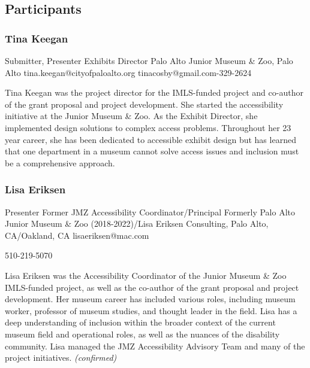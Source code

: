 \documentclass{report}
\begin{document}
            \subsection*{Participants}
              \subsubsection*{ Tina  Keegan }
              Submitter, Presenter\newline
              Exhibits Director\newline
              Palo Alto Junior Museum \& Zoo, Palo Alto
              \newline
              tina.keegan@cityofpaloalto.org\newline
              tinacosby@gmail.com-329-2624\newline

              Tina Keegan was the project director for the IMLS-funded project and co-author of the grant proposal and project development. She started the accessibility initiative at the Junior Museum \& Zoo. As the Exhibit Director, she implemented design solutions to complex access problems. Throughout her 23 year career, she has been dedicated to accessible exhibit design but has learned that one department in a museum cannot solve access issues and inclusion must be a comprehensive approach.\newline


              

              
                \subsubsection*{ Lisa Eriksen }
                Presenter\newline
                Former JMZ Accessibility Coordinator/Principal\newline
                Formerly Palo Alto Junior Museum \& Zoo (2018-2022)/Lisa Eriksen Consulting, Palo Alto, CA/Oakland, CA
                \newline
                lisaeriksen@mac.com\newline
                
                510-219-5070\newline

                Lisa Eriksen was the Accessibility Coordinator of the Junior Museum \& Zoo IMLS-funded project, as well as the co-author of the grant proposal and project development. Her museum career has included various roles, including museum worker, professor of museum studies, and thought leader in the field. Lisa has a deep understanding of inclusion within the broader context of the current museum field and operational roles, as well as the nuances of the disability community. Lisa managed the JMZ Accessibility Advisory Team and many of the project initiatives.
                \emph{ (confirmed) }
              
\end{document}
